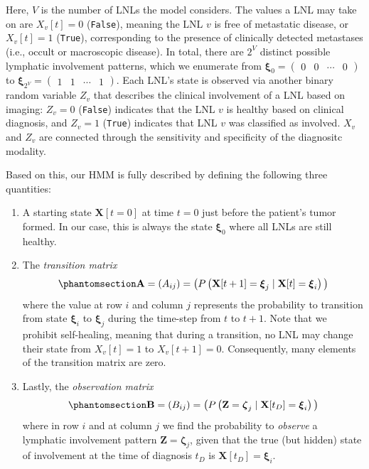 \documentclass[
  sn-mathphys-num,
]{sn-jnl}
\providecommand{\tightlist}{%
  \setlength{\itemsep}{0pt}\setlength{\parskip}{0pt}}\usepackage{longtable,booktabs,array}
\begin{document}
Here, \(V\) is the number of LNLs the model considers. The values a LNL
may take on are \(X_v[t] = 0\) (\texttt{False}), meaning the LNL \(v\)
is free of metastatic disease, or \(X_v[t] = 1\) (\texttt{True}),
corresponding to the presence of clinically detected metastases (i.e.,
occult or macroscopic disease). In total, there are \(2^V\) distinct
possible lymphatic involvement patterns, which we enumerate from
\(\boldsymbol{\xi}_0 = \begin{pmatrix} 0 & 0 & \cdots & 0 \end{pmatrix}\)
to
\(\boldsymbol{\xi}_{2^V} = \begin{pmatrix} 1 & 1 & \cdots & 1 \end{pmatrix}\).
Each LNL's state is observed via another binary random variable \(Z_v\)
that describes the clinical involvement of a LNL based on imaging:
\(Z_v = 0\) (\texttt{False}) indicates that the LNL \(v\) is healthy
based on clinical diagnosis, and \(Z_v = 1\) (\texttt{True}) indicates
that LNL \(v\) was classified as involved. \(X_v\) and \(Z_v\) are
connected through the sensitivity and specificity of the diagnositc
modality.

Based on this, our HMM is fully described by defining the following
three quantities:

\begin{enumerate}
\def\labelenumi{\arabic{enumi}.}
\tightlist
\item
  A starting state \(\mathbf{X}[t=0]\) at time \(t=0\) just before the
  patient's tumor formed. In our case, this is always the state
  \(\boldsymbol{\xi}_0\) where all LNLs are still healthy.
\item
  The \emph{transition matrix}
  \begin{equation}\phantomsection\label{eq-trans-matrix}{
  \mathbf{A} = \left( A_{ij} \right) = \big( P \left( \mathbf{X}[t+1] = \boldsymbol{\xi}_j \mid \mathbf{X}[t] = \boldsymbol{\xi}_i \right) \big)
  }\end{equation} where the value at row \(i\) and column \(j\)
  represents the probability to transition from state
  \(\boldsymbol{\xi}_i\) to \(\boldsymbol{\xi}_j\) during the time-step
  from \(t\) to \(t+1\). Note that we prohibit self-healing, meaning
  that during a transition, no LNL may change their state from
  \(X_v[t]=1\) to \(X_v[t+1]=0\). Consequently, many elements of the
  transition matrix are zero.
\item
  Lastly, the \emph{observation matrix}
  \begin{equation}\phantomsection\label{eq-obs-matrix}{
  \mathbf{B} = \left( B_{ij} \right) = \big( P \left( \mathbf{Z} = \boldsymbol{\zeta}_j \mid \mathbf{X}[t_D] = \boldsymbol{\xi}_i \right) \big)
  }\end{equation} where in row \(i\) and at column \(j\) we find the
  probability to \emph{observe} a lymphatic involvement pattern
  \(\mathbf{Z} = \boldsymbol{\zeta}_j\), given that the true (but
  hidden) state of involvement at the time of diagnosis \(t_D\) is
  \(\mathbf{X}[t_D] = \boldsymbol{\xi}_i\).
\end{enumerate}
\end{document}
